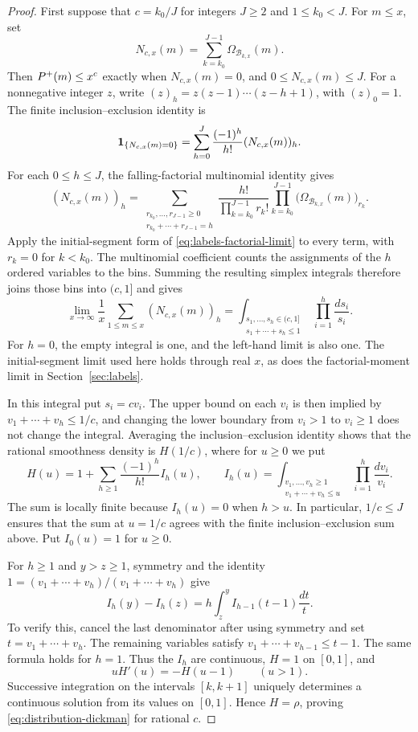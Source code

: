 \begin{proof}
First suppose that $c=k_0/J$ for integers $J\ge2$ and $1\le k_0<J$.
For $m\le x$, set
\[
 N_{c,x}(m)=\sum_{k=k_0}^{J-1}\Omega_{\mathcal B_{k,x}}(m).
\]
Then $P^+(m)\le x^c$ exactly when $N_{c,x}(m)=0$, and
$0\le N_{c,x}(m)\le J$.  For a nonnegative integer $z$, write
$(z)_h=z(z-1)\cdots(z-h+1)$, with $(z)_0=1$.  The finite
inclusion--exclusion identity is
\[
 \mathbf 1_{\{N_{c,x}(m)=0\}}
    =\sum_{h=0}^{J}\frac{(-1)^h}{h!}(N_{c,x}(m))_h.
\]
For each $0\le h\le J$, the falling-factorial multinomial identity gives
\[
 (N_{c,x}(m))_h
 =\sum_{\substack{r_{k_0},\ldots,r_{J-1}\ge0\\
                   r_{k_0}+\cdots+r_{J-1}=h}}
     \frac{h!}{\prod_{k=k_0}^{J-1}r_k!}
     \prod_{k=k_0}^{J-1}
       \bigl(\Omega_{\mathcal B_{k,x}}(m)\bigr)_{r_k}.
\]
Apply the initial-segment form of \eqref{eq:labels-factorial-limit}
to every term, with $r_k=0$ for $k<k_0$.  The multinomial coefficient
counts the assignments of the $h$ ordered variables to the bins.  Summing the resulting
simplex integrals therefore joins those bins into $(c,1]$ and gives
\[
 \lim_{x\to\infty}\frac1x\sum_{1\le m\le x}(N_{c,x}(m))_h
 =\int_{\substack{s_1,\ldots,s_h\in(c,1]\\
                   s_1+\cdots+s_h\le1}}
       \prod_{i=1}^h\frac{ds_i}{s_i}.
\]
For $h=0$, the empty integral is one, and the left-hand limit is also one.
The initial-segment limit used here holds through real $x$, as does the factorial-moment
limit in Section~\ref{sec:labels}.

In this integral put $s_i=cv_i$.  The upper bound on each $v_i$
is then implied by $v_1+\cdots+v_h\le1/c$, and changing the lower
boundary from $v_i>1$ to $v_i\ge1$ does not change the integral.
Averaging the inclusion--exclusion identity shows that the rational
smoothness density is $H(1/c)$, where for $u\ge0$ we put
\begin{equation}
 H(u)=1+\sum_{h\ge1}\frac{(-1)^h}{h!}I_h(u),\qquad
 I_h(u)=\int_{\substack{v_1,\ldots,v_h\ge1\\
                         v_1+\cdots+v_h\le u}}
                  \prod_{i=1}^h\frac{dv_i}{v_i}.
 \label{eq:distribution-H}
\end{equation}
The sum is locally finite because $I_h(u)=0$ when $h>u$.
In particular, $1/c\le J$ ensures that the sum at $u=1/c$ agrees
with the finite inclusion--exclusion sum above.  Put $I_0(u)=1$
for $u\ge0$.

For $h\ge1$ and $y>z\ge1$, symmetry and the identity
$1=(v_1+\cdots+v_h)/(v_1+\cdots+v_h)$ give
\begin{equation}
 I_h(y)-I_h(z)
       =h\int_z^y I_{h-1}(t-1)\frac{dt}{t}.
 \label{eq:distribution-delay}
\end{equation}
To verify this, cancel the last denominator after using symmetry
and set $t=v_1+\cdots+v_h$.  The remaining variables satisfy
$v_1+\cdots+v_{h-1}\le t-1$.  The same formula holds for $h=1$.
Thus the $I_h$ are continuous, $H=1$ on $[0,1]$, and
\[
 uH'(u)=-H(u-1)\qquad(u>1).
\]
Successive integration on the intervals $[k,k+1]$ uniquely
determines a continuous solution from its values on $[0,1]$.
Hence $H=\rho$, proving \eqref{eq:distribution-dickman} for rational $c$.


\end{proof}
